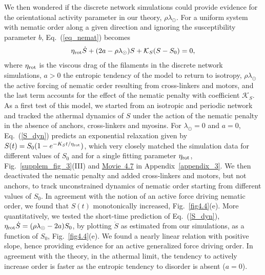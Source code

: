 We then wondered if the discrete network simulations could provide evidence for the orientational activity parameter in our theory, $\rho \lambda_{\odot}$. For a uniform system with nematic order along a given direction and ignoring the susceptibility parameter $b$, Eq.~(\ref{eq_nemat}) becomes
\begin{align}
	\eta_{\rm rot}\dot{S} + (2a-\rho \lambda_{\odot})S + \mathcal{K}_S(S-S_0) = 0,
	\label{S_dyn}
\end{align}
where $\eta_{\rm rot}$ is the viscous drag of the filaments in the discrete network simulations, $a>0$ the entropic tendency of the model to return to isotropy, $\rho \lambda_{\odot}$ the active forcing of nematic order resulting from cross-linkers and motors, and the last term accounts for the effect of the nematic penalty with coefficient $\mathcal{K}_S$. As a first test of this model, we started from an isotropic and periodic network and tracked the athermal dynamics of $S$ under the action of the nematic penalty in the absence of anchors, cross-linkers and myosins. For  $ \lambda_{\odot} = 0$ and $a=0$, Eq.~(\ref{S_dyn}) predicts an exponential relaxation given by $S(t) = S_0 (1-e^{-K_St/\eta_{\rm rot}})$, which very closely matched the simulation data for different values of $S_0$ and for a single fitting parameter $\eta_{\rm rot}$, Fig.~\ref{supplem_fig_3}(III) and  \href{https://github.com/waleedmirzaPhD/movies_thesis.git}{Movie~4.7} in Appendix~\ref{appendix_3}. We then deactivated the nematic penalty and added cross-linkers and motors, but not anchors, to track unconstrained dynamics of nematic order starting from different values of $S_0$. In agreement with the notion of an active force driving nematic order, we found that $S(t)$ monotonically increased, Fig.~\ref{fig4.4}(e). More quantitatively, we tested the short-time prediction of Eq.~(\ref{S_dyn}), $\eta_{\rm rot}\dot{S} = (\rho \lambda_{\odot}-2a)S_0$, by plotting $\dot{S}$ as estimated from our simulations, as a function of $S_0$, Fig.~\ref{fig4.4}(e). We found a nearly linear relation with positive slope, hence providing evidence for an active generalized force driving order. In agreement with the theory, in the athermal limit, the tendency to actively increase order is faster as the entropic tendency to disorder is absent ($a=0$).  


